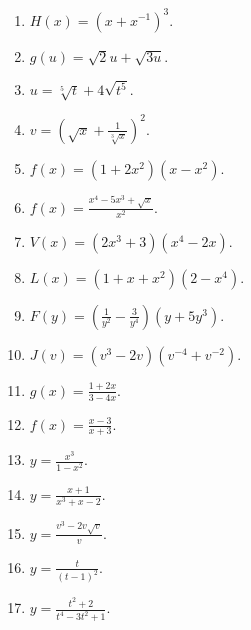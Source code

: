 \begin{problem}
\begin{multicols}{2}
\begin{enumerate}
\item $H(x)=(x+x^{-1})^3$.

\item $g(u)=\sqrt 2 u +\sqrt{3u}$.

\item $u=\sqrt[5]t+4\sqrt{t^5}$.

\item $v=\left(\sqrt{x}+\frac{1}{\sqrt[3]{x}}\right)^2$.


\item $f(x)=(1+2x^2)(x-x^2)$.

\item $f(x)=\frac{x^4-5x^3+\sqrt{x}}{x^2}$.

\item $V(x)=(2x^3+3)(x^4-2x)$.

\item $L(x)=(1+x+x^2)(2-x^4)$.

\item $F(y)=\left(\frac{1}{y^2}-\frac{3}{y^4} \right)(y+5y^3)$.

\item $J(v)=(v^3-2v)(v^{-4}+v^{-2})$.

\item $g(x)=\frac{1+2x}{3-4x}$.

\item $f(x)=\frac{x-3}{x+3}$.

\item $y=\frac{x^3}{1-x^2}$.

\item $y=\frac{x+1}{x^3+x-2}$.

\item $y=\frac{v^3-2v\sqrt{v}}{v}$.

\item $y=\frac{t}{(t-1)^2}$.

\item $y=\frac{t^2+2}{t^4-3t^2+1}$.


\end{enumerate}
\end{multicols}
\end{problem}
